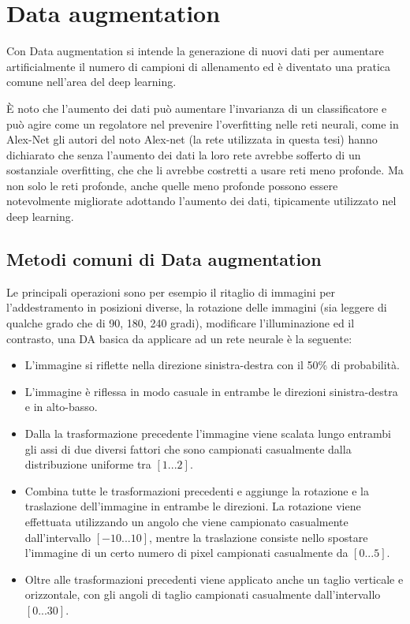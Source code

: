 \chapter{Data augmentation}\label{data-augmentation}

Con Data augmentation si intende la generazione di nuovi dati  per aumentare artificialmente il numero di campioni di allenamento ed è diventato una pratica comune nell'area del deep learning.

È noto che l'aumento dei dati può aumentare l'invarianza di un classificatore e può agire come un regolatore nel prevenire l'overfitting nelle reti neurali, come in Alex-Net  gli autori del noto Alex-net (la rete utilizzata in questa tesi) hanno dichiarato che senza l'aumento dei dati la loro rete avrebbe sofferto di un sostanziale overfitting, che che li avrebbe costretti a usare reti meno profonde\cite{alexnet}. Ma non solo le reti profonde, anche quelle meno profonde  possono essere notevolmente migliorate adottando l'aumento dei dati, tipicamente utilizzato nel deep learning\cite{dataaugmentation}.


\section{Metodi comuni di Data augmentation}\label{metodi-comuni-di-data-augmentation}

Le principali operazioni sono per esempio  il ritaglio di immagini
per l'addestramento in posizioni diverse, la rotazione delle immagini (sia leggere di qualche grado che di 90, 180, 240 gradi), modificare l'illuminazione ed il contrasto, una DA basica da applicare ad un rete neurale è la seguente\cite{nanni_dtc_pca}:
\begin{itemize}
    \item L'immagine si riflette nella direzione sinistra-destra con il 50\% di probabilità. 
    \item L'immagine è riflessa in modo casuale in entrambe le direzioni sinistra-destra e in alto-basso.
    \item Dalla la trasformazione precedente l'immagine viene scalata lungo entrambi gli assi di due diversi fattori che sono
    campionati casualmente dalla distribuzione uniforme tra \([1...2]\).
    \item Combina tutte le trasformazioni precedenti  e aggiunge la rotazione e la traslazione dell'immagine in entrambe le
    direzioni. La rotazione viene effettuata utilizzando un angolo che viene campionato casualmente dall'intervallo
    \([-10...10]\), mentre la traslazione consiste nello spostare l'immagine di un certo numero di pixel
    campionati casualmente da \([0...5]\).
    \item Oltre alle trasformazioni precedenti viene applicato anche un taglio verticale e orizzontale, con gli angoli di taglio
    campionati casualmente dall'intervallo \([0...30]\).
\end{itemize}

